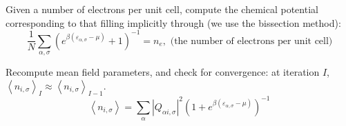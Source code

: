 Given a number of electrons per unit cell, compute the chemical potential corresponding to that filling implicitly through (we use the bissection method):
\begin{equation}\label{eq:implicitChemPot}
\frac{1}{N} \sum_{\alpha, \sigma} (  e^{\beta ( \varepsilon_{\alpha, \sigma} - \mu ) } +1 )^{-1} = n_e , \,\, \text{(the number of electrons per unit cell)}
\end{equation}

Recompute mean field parameters, and check for convergence: at iteration $I$, $\left\langle n_{i,\sigma} \right\rangle_I \approx \left\langle n_{i,\sigma} \right\rangle_{I - 1}$.
\begin{equation}\label{eq:selfConsistent}
\left\langle n_{i,\sigma} \right\rangle = \sum_\alpha | Q_{\alpha i, \sigma} |^2 ( 1 + e^ { \beta ( \varepsilon_{\alpha, \sigma} - \mu )} )^{-1}
\end{equation}

